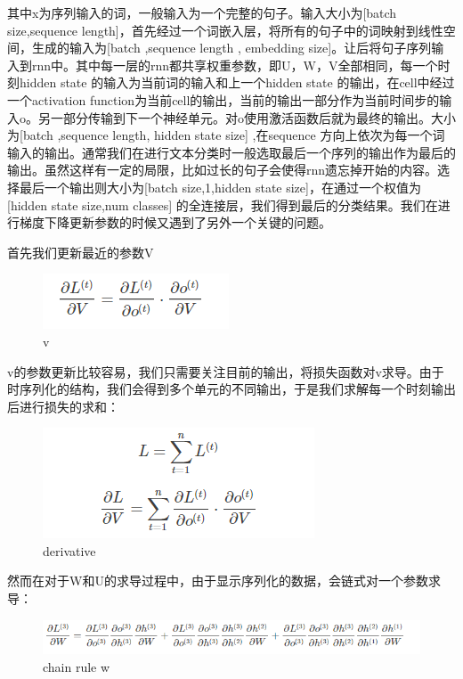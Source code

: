 \documentclass{article}
\begin{document}
其中x为序列输入的词，一般输入为一个完整的句子。输入大小为[batch size,sequence length]，首先经过一个词嵌入层，将所有的句子中的词映射到线性空间，生成的输入为[batch ,sequence length ,  embedding size]。让后将句子序列输入到rnn中。其中每一层的rnn都共享权重参数，即U，W，V全部相同，每一个时刻hidden state 的输入为当前词的输入和上一个hidden state 的输出，在cell中经过一个activation function为当前cell的输出，当前的输出一部分作为当前时间步的输入o。另一部分传输到下一个神经单元。对o使用激活函数后就为最终的输出。大小为[batch ,sequence length, hidden state size] ,在sequence 方向上依次为每一个词输入的输出。通常我们在进行文本分类时一般选取最后一个序列的输出作为最后的输出。虽然这样有一定的局限，比如过长的句子会使得rnn遗忘掉开始的内容。选择最后一个输出则大小为[batch size,1,hidden state size]，在通过一个权值为[hidden state size,num classes] 的全连接层，我们得到最后的分类结果。我们在进行梯度下降更新参数的时候又遇到了另外一个关键的问题。

首先我们更新最近的参数V
\begin{figure}
  \centering
  \includegraphics[width=.8\textwidth]{v.png} %
  \caption{v}
  \label{fig:fig1}
\end{figure}

v的参数更新比较容易，我们只需要关注目前的输出，将损失函数对v求导。由于时序列化的结构，我们会得到多个单元的不同输出，于是我们求解每一个时刻输出后进行损失的求和：
\begin{figure}
  \centering
  \includegraphics[width=.8\textwidth]{derivative.png} %
  \caption{derivative}
  \label{fig:fig1}
\end{figure}


然而在对于W和U的求导过程中，由于显示序列化的数据，会链式对一个参数求导：
\begin{figure}
  \centering
  \includegraphics[width=.8\textwidth]{chain rule.png} %
  \caption{chain rule w}
  \label{fig:fig1}
\end{figure}
\end{document}

